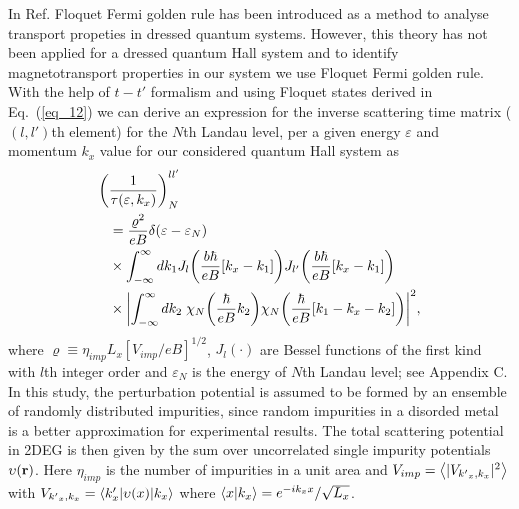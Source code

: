 
In Ref. \cite{wackerl20} Floquet Fermi golden rule has been introduced as a method to analyse transport propeties in dressed quantum systems. However, this theory has not been applied for a dressed quantum Hall system and to identify magnetotransport properties in our system we use Floquet Fermi golden rule.
With the help of $t-t'$ formalism \cite{wackerl20,grifoni98,sambe75,peskin93,althorpe97} and using Floquet states derived in Eq.~(\ref{eq_12}) we can derive an  expression for the inverse scattering time matrix ($(l,l')$th element) for the $N$th Landau level, per a given energy $\varepsilon$ and momentum $k_x$ value for our considered quantum Hall system as
\begin{equation} \label{eq_13}
  \begin{aligned}
    \bigg(&\frac{1}{\tau(\varepsilon,k_x)}\bigg)^{ll'}_{N} \\
    & =
    \frac { \varrho^2}{eB}
    \delta(\varepsilon - \varepsilon_{N}) \\
    & \times
    \int_{-\infty}^{\infty} d k_1
    J_l\qty(\frac{b\hbar}{eB}[{k}_x - k_1])
    J_{l'}\qty(\frac{b\hbar}{eB}[{k}_x - k_1]) \\
    & \times
    \qty|
    \int_{-\infty}^{\infty} dk_2 \;
    {\chi}_{N}\qty(\frac{\hbar}{eB}k_2)
    {\chi}_{N}\qty(\frac{\hbar}{eB} \qty[k_1 - {k}_x - k_2])|^2,
  \end{aligned}
\end{equation}
where $\varrho \equiv \eta_{imp} L_x [ { V_{imp}}/{eB}]^{1/2}$,
$J_l(\cdot)$ are Bessel functions of the first kind with $l$th integer order and $\varepsilon_N$ is the energy of $N$th Landau level; see Appendix C. In this study, the perturbation potential is assumed to be formed by an ensemble of randomly distributed impurities, since random impurities in a disorded metal is a better approximation for experimental results. The total  scattering potential in 2DEG is then given by the sum over uncorrelated single impurity potentials $\upsilon(\vb{r})$. Here $\eta_{imp}$ is the number of impurities in a unit area and $V_{imp} = \expval{|V_{{k'}_x,k_x}|^2}$ with $V_{{k'}_x,k_x} = \mel**{k'_x}{\upsilon(x) }{k_x}$ where $\braket{x}{k_x} = e^{-ik_x x}/\sqrt{L_x}$.

